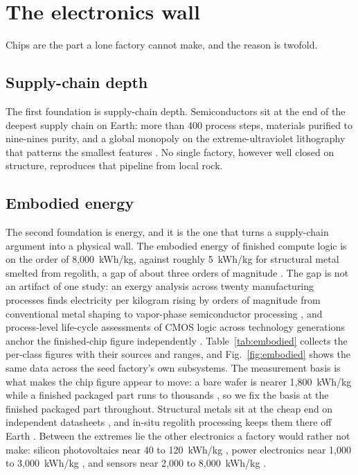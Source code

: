 \section{The electronics wall}

Chips are the part a lone factory cannot make, and the reason is twofold.

\subsection{Supply-chain depth}
The first foundation is supply-chain depth. Semiconductors sit at the end of the deepest
supply chain on Earth: more than 400 process steps, materials purified to nine-nines
purity, and a global monopoly on the extreme-ultraviolet lithography that patterns the
smallest features \cite{csis-semiconductor-supply-chain}. No single factory, however well
closed on structure, reproduces that pipeline from local rock.

\subsection{Embodied energy}
The second foundation is energy, and it is the one that turns a supply-chain argument into
a physical wall. The embodied energy of finished compute logic is on the order of
8{,}000~kWh/kg, against roughly 5~kWh/kg for structural metal smelted from regolith, a gap
of about three orders of magnitude \cite{williams-ayres-heller-2002,nagapurkar-das-2022}.
The gap is not an artifact of one study: an exergy analysis across twenty manufacturing
processes finds electricity per kilogram rising by orders of magnitude from conventional
metal shaping to vapor-phase semiconductor processing \cite{gutowski-2009}, and
process-level life-cycle assessments of CMOS logic across technology generations anchor the
finished-chip figure independently \cite{boyd-2012}. Table~\ref{tab:embodied} collects the
per-class figures with their sources and ranges, and Fig.~\ref{fig:embodied} shows the same
data across the seed factory's own subsystems. The measurement basis is what makes the
chip figure appear to move: a bare wafer is nearer 1{,}800~kWh/kg while a finished packaged
part runs to thousands \cite{murphy-2003}, so we fix the basis at the finished packaged
part throughout. Structural metals sit at the cheap end on independent datasheets
\cite{ice-coefficients,ashby-2012}, and in-situ regolith processing keeps them there off
Earth \cite{guerrero-zabel-2023}. Between the extremes lie the other electronics a factory
would rather not make: silicon photovoltaics near 40 to 120~kWh/kg \cite{peng-2013-pv-lca},
power electronics near 1{,}000 to 3{,}000~kWh/kg \cite{power-electronics-lca}, and sensors
near 2{,}000 to 8{,}000~kWh/kg \cite{sensor-embodied-2021}.

